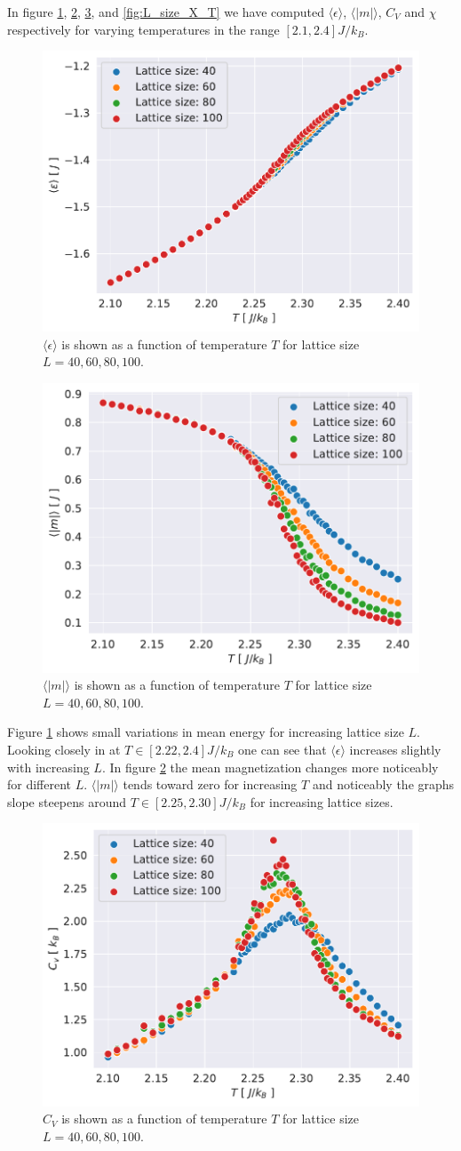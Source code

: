 \documentclass[english,notitlepage,reprint,nofootinbib]{revtex4-1}  %
\begin{document}
In figure \ref{fig:L_size_e_T}, \ref{fig:L_size_m_T}, \ref{fig:L_size_c_v_T},  and \ref{fig:L_size_X_T} we have computed $\langle \epsilon \rangle$, $\langle |m|\rangle$, $C_V$ and $\chi$ respectively for varying temperatures in the range $[2.1,2.4]J/k_B$.
\begin{figure}[H]
    \centering
    \includegraphics[width=.5\textwidth]{../figures/L_size_e_T.pdf}
    \caption{$\langle \epsilon \rangle$ is shown as a function of temperature $T$ for lattice size $L= 40, 60,80,100$.}
    \label{fig:L_size_e_T}
\end{figure}

\begin{figure}[H]
    \centering
    \includegraphics[width=.5\textwidth]{../figures/L_size_m_T.pdf}
    \caption{$\langle |m| \rangle$ is shown as a function of temperature $T$ for lattice size $L= 40, 60,80,100$.}
    \label{fig:L_size_m_T}
\end{figure}
Figure \ref{fig:L_size_e_T} shows small variations in mean energy for increasing lattice size $L$. Looking closely in at $T \in [2.22,2.4]J/k_B$ one can see that $\langle \epsilon \rangle$ increases slightly with increasing $L$. In figure \ref{fig:L_size_m_T} the mean magnetization changes more noticeably for different $L$. $\langle |m| \rangle$ tends toward zero for increasing $T$ and noticeably the graphs slope steepens around $T \in [2.25,2.30]J/k_B$ for increasing lattice sizes.

\begin{figure}[H]
    \centering
    \includegraphics[width=.5\textwidth]{../figures/L_size_c_v_T.pdf}
    \caption{$C_V$ is shown as a function of temperature $T$ for lattice size $L= 40, 60,80,100$.}
    \label{fig:L_size_c_v_T}
\end{figure}
\end{document}
